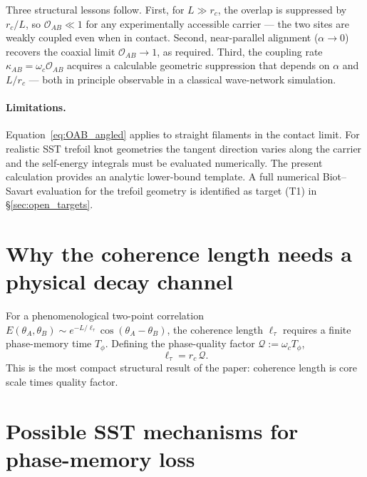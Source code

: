 \documentclass[11pt]{article}
\newcommand{\rc}{r_c}
\begin{document}
Three structural lessons follow. First, for $L \gg r_c$, the overlap is suppressed by $r_c/L$, so $\mathcal{O}_{AB} \ll 1$ for any experimentally accessible carrier — the two sites are weakly coupled even when in contact. Second, near-parallel alignment ($\alpha \to 0$) recovers the coaxial limit $\mathcal{O}_{AB} \to 1$, as required. Third, the coupling rate $\kappa_{AB} = \omega_c \mathcal{O}_{AB}$ acquires a calculable geometric suppression that depends on $\alpha$ and $L/r_c$ — both in principle observable in a classical wave-network simulation.

\paragraph{Limitations.} Equation~\eqref{eq:OAB_angled} applies to straight filaments in the contact limit. For realistic SST trefoil knot geometries the tangent direction varies along the carrier and the self-energy integrals must be evaluated numerically. The present calculation provides an analytic lower-bound template. A full numerical Biot--Savart evaluation for the trefoil geometry is identified as target (T1) in §\ref{sec:open_targets}.

\section{Why the coherence length needs a physical decay channel}

For a phenomenological two-point correlation $E(\theta_A,\theta_B) \sim e^{-L/\ell_\tau}\cos(\theta_A - \theta_B)$, the coherence length $\ell_\tau$ requires a finite phase-memory time $T_\phi$. Defining the phase-quality factor $\mathcal{Q} := \omega_c T_\phi$,
\begin{equation}
    \ell_\tau = \rc\,\mathcal{Q}.
    \label{eq:l_tau}
\end{equation}
This is the most compact structural result of the paper: coherence length is core scale times quality factor.

\section{Possible SST mechanisms for phase-memory loss}
\end{document}
